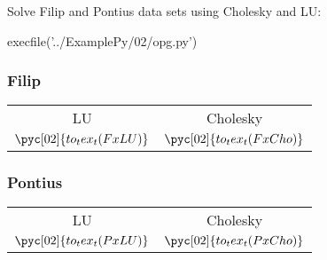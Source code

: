 \documentclass[../main.tex]{subfiles}
\begin{document}
Solve Filip and Pontius data sets using Cholesky and LU:

\begin{pycode}[02]
execfile('../ExamplePy/02/opg.py')
\end{pycode}

\subsubsection*{Filip}%
\label{ssub:filip}


\begin{tabular}{cc}
	LU&Cholesky\\
	$\pyc[02]{to_tex_t(FxLU)}$ &
	$\pyc[02]{to_tex_t(FxCho)}$ 
\end{tabular}

\subsubsection*{Pontius}%
\label{ssub:pontius}

\begin{tabular}{cc}
	LU&Cholesky\\
	$\pyc[02]{to_tex_t(PxLU)}$ &
	$\pyc[02]{to_tex_t(PxCho)}$ 
\end{tabular}

\inputminted{python}{'../ExamplePy/02/opg.py'}

	
\end{document}

